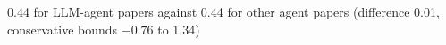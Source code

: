 0.44 for LLM-agent papers against 0.44 for other agent papers (difference 0.01, conservative bounds $-0.76$ to 1.34)